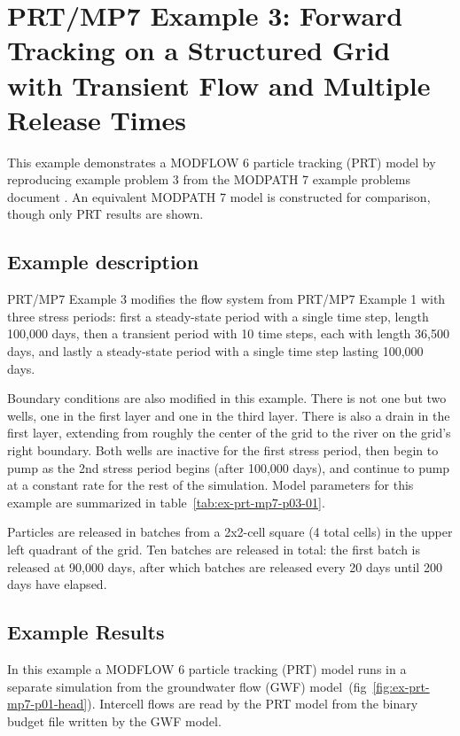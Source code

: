 \section{PRT/MP7 Example 3: Forward Tracking on a Structured Grid with Transient Flow and Multiple Release Times}

This example demonstrates a MODFLOW 6 particle tracking (PRT) model by reproducing example problem 3 from the MODPATH 7 \citep{pollock2016modpath7} example problems document \citep{modpath7examples}. An equivalent MODPATH 7 model is constructed for comparison, though only PRT results are shown.

\subsection{Example description}

PRT/MP7 Example 3 modifies the flow system from PRT/MP7 Example 1 with three stress periods: first a steady-state period with a single time step, length 100,000 days, then a transient period with 10 time steps, each with length 36,500 days, and lastly a steady-state period with a single time step lasting 100,000 days.

Boundary conditions are also modified in this example. There is not one but two wells, one in the first layer and one in the third layer. There is also a drain in the first layer, extending from roughly the center of the grid to the river on the grid's right boundary. Both wells are inactive for the first stress period, then begin to pump as the 2nd stress period begins (after 100,000 days), and continue to pump at a constant rate for the rest of the simulation. Model parameters for this example are summarized in table~\ref{tab:ex-prt-mp7-p03-01}.

Particles are released in batches from a 2x2-cell square (4 total cells) in the upper left quadrant of the grid. Ten batches are released in total: the first batch is released at 90,000 days, after which batches are released every 20 days until 200 days have elapsed.



\subsection{Example Results}

In this example a MODFLOW 6 particle tracking (PRT) model runs in a separate simulation from the groundwater flow (GWF) model~(fig~\ref{fig:ex-prt-mp7-p01-head}). Intercell flows are read by the PRT model from the binary budget file written by the GWF model.

